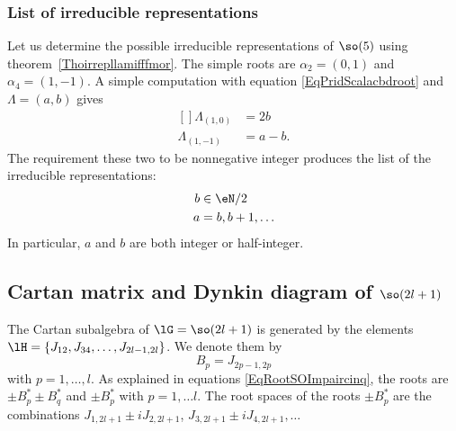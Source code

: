 \subsubsection{List of irreducible representations}

Let us determine the possible irreducible representations of $\so(5)$ using theorem~\ref{Thoirrepllamifffmor}. The simple roots are $\alpha_2=(0,1)$ and $\alpha_4=(1,-1)$. A simple computation with equation \eqref{EqPridScalacbdroot} and $\Lambda=(a,b)$ gives
\begin{equation}
	\begin{aligned}[]
		\Lambda_{(1,0)}&=2b\\
		\Lambda_{(1,-1)}&=a-b.
	\end{aligned}
\end{equation}
The requirement these two to be nonnegative integer produces the list of the irreducible representations:
\begin{equation}			\label{EqIrrepsso5}
	\begin{aligned}[]
		b&\in \eN/2\\
		a&=b,b+1,\ldots
	\end{aligned}
\end{equation}
In particular, $a$ and $b$ are both integer or half-integer.

\subsection{Cartan matrix and Dynkin diagram of \texorpdfstring{$\so(2l+1)$}{so2l+1}}

The Cartan subalgebra of $\lG=\so(2l+1)$ is generated by the elements $\lH=\{ J_{12},J_{34},\ldots,J_{2l-1,2l} \}$.  We denote them by
\begin{equation}
	B_p=J_{2p-1,2p}
\end{equation}
with $p=1,\ldots,l$. As explained in equations \eqref{EqRootSOImpaircinq}, the roots are $\pm B_p^*\pm B_q^*$ and $\pm B_p^*$ with $p=1,\ldots l$. The root spaces of the roots $\pm B^*_p$ are the combinations $J_{1,2l+1}\pm iJ_{2,2l+1}$, $J_{3,2l+1}\pm iJ_{4,2l+1},\ldots$

